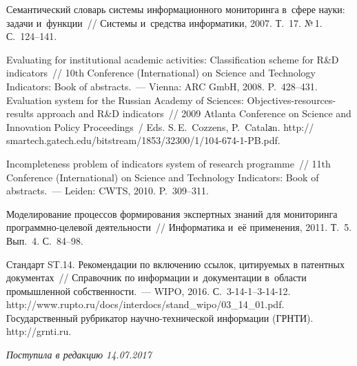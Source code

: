 \begin{multicols}{2}
{{\begin{thebibliography}{99}
 Семантический словарь системы информационного 
мониторинга в~сфере науки: задачи и~функции~// Системы и~средства информатики, 2007. 
Т.~17. №\,1. С.~124--141.

 Evaluating for institutional academic activities: 
Classification scheme for R\&D indicators~// 10th  Conference 
(International) on Science and Technology Indicators: Book of abstracts.~--- 
Vienna: ARC GmbH, 2008. P.~428--431.
Evaluation system for the Russian Academy of Sciences: Objectives-resources-results 
approach and R\&D indicators~// 2009 Atlanta Conference on Science and Innovation 
Policy Proceedings~/ Eds. S.\,E.~Cozzens, P.~Catalаn. 
{\sf http:// smartech.gatech.edu/bitstream/1853/32300/1/104-674-1-PB.pdf}.

 Incompleteness 
problem of indicators system of research programme~// 
11th  Conference (International) on Science and Technology Indicators: 
Book of abstracts.~--- Leiden: CWTS, 2010. P.~309--311.

Моделирование процессов формирования экспертных знаний для мониторинга
 про\-граммно-це\-ле\-вой деятельности~// Информатика и~её применения, 2011. 
 Т.~5. Вып.~4. С.~84--98.


Стандарт ST.14. Рекомендации по включению ссылок, цитируемых в патентных документах~// 
Справочник по информации и~документации в~об\-ласти промышленной собственности.~--- 
WIPO, 2016. С.~3-14-1--3-14-12. 
{\sf http://www.rupto.ru/docs/\linebreak interdocs/stand\_wipo/03\_14\_01.pdf}.
Государственный рубрикатор на\-уч\-но-тех\-ни\-че\-ской информации (ГРНТИ).
{\sf  http://grnti.ru}. 


\end{thebibliography}
} }

\end{multicols}

 \label{end\stat}

 \vspace*{-3pt}

\hfill{\small\textit{Поступила в редакцию  14.07.2017}}
\renewcommand{\figurename}{\protect\bf Рис.}
\renewcommand{\tablename}{\protect\bf Таблица}